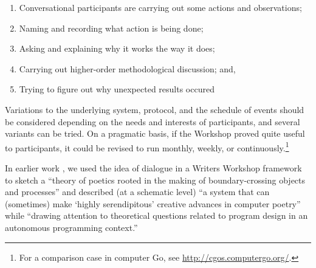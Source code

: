 \begin{center}
\begin{fminipage}{.8\columnwidth}
\begin{minipage}{1\textwidth}
\begin{enumerate}[itemsep=0pt,rightmargin=10pt]
\item Conversational participants are carrying
out some actions and observations;
\item Naming and recording what action is being done;
\item Asking and explaining why it works the way
it does;
\item Carrying out higher-order methodological discussion; and, 
\item Trying to figure out why unexpected results occured
\end{enumerate}
\end{minipage}
\end{fminipage}
\end{center}

Variations to the underlying system, protocol, and the schedule of
events should be considered depending on the needs and interests of
participants, and several variants can be tried.  On a pragmatic
basis, if the Workshop proved quite useful to participants, it could
be revised to run monthly, weekly, or continuously.\footnote{For a
  comparison case in computer Go, see
  \url{http://cgos.computergo.org/}.}


In earlier work \cite{corneli15cc,corneli15iccc}, we used the idea of
dialogue in a Writers Workshop framework to sketch a ``theory of
poetics rooted in the making of boundary-crossing objects and
processes'' and described (at a schematic level) ``a system that can
(sometimes) make `highly serendipitous' creative advances in computer
poetry'' while ``drawing attention to theoretical questions related to
program design in an autonomous programming context.''




